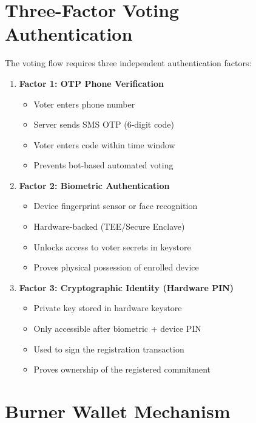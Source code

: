 \section{Three-Factor Voting Authentication}

The voting flow requires three independent authentication factors:

\begin{enumerate}
    \item \textbf{Factor 1: OTP Phone Verification}
    \begin{itemize}
        \item Voter enters phone number
        \item Server sends SMS OTP (6-digit code)
        \item Voter enters code within time window
        \item Prevents bot-based automated voting
    \end{itemize}
    
    \item \textbf{Factor 2: Biometric Authentication}
    \begin{itemize}
        \item Device fingerprint sensor or face recognition
        \item Hardware-backed (TEE/Secure Enclave)
        \item Unlocks access to voter secrets in keystore
        \item Proves physical possession of enrolled device
    \end{itemize}
    
    \item \textbf{Factor 3: Cryptographic Identity (Hardware PIN)}
    \begin{itemize}
        \item Private key stored in hardware keystore
        \item Only accessible after biometric + device PIN
        \item Used to sign the registration transaction
        \item Proves ownership of the registered commitment
    \end{itemize}
\end{enumerate}

\section{Burner Wallet Mechanism}

